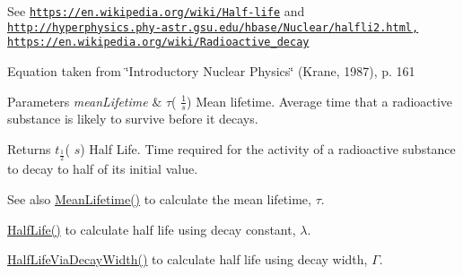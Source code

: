 See \href{https://en.wikipedia.org/wiki/Half-life}{\tt https\+://en.\+wikipedia.\+org/wiki/\+Half-\/life} and \href{http://hyperphysics.phy-astr.gsu.edu/hbase/Nuclear/halfli2.html,}{\tt http\+://hyperphysics.\+phy-\/astr.\+gsu.\+edu/hbase/\+Nuclear/halfli2.\+html,} \href{https://en.wikipedia.org/wiki/Radioactive_decay}{\tt https\+://en.\+wikipedia.\+org/wiki/\+Radioactive\+\_\+decay}

Equation taken from \char`\"{}\+Introductory Nuclear Physics\char`\"{} (Krane, 1987), p. 161


\begin{DoxyParams}{Parameters}
{\em mean\+Lifetime} & $\tau$( $\frac{1}{s}$) Mean lifetime. Average time that a radioactive substance is likely to survive before it decays. \\
\hline
\end{DoxyParams}
\begin{DoxyReturn}{Returns}
$t_{\frac{1}{2}}$( $s$) Half Life. Time required for the activity of a radioactive substance to decay to half of its initial value. 
\end{DoxyReturn}
\begin{DoxySeeAlso}{See also}
\hyperlink{group___atomic_gaa9e3c2deedda4bc7a745568b06fc47eb}{Mean\+Lifetime()} to calculate the mean lifetime, $\tau$. 

\hyperlink{group___half_life_ga21d268f154fb91c1c556bbfa7fe83ac1}{Half\+Life()} to calculate half life using decay constant, $\lambda$. 

\hyperlink{group___half_life_gaba3fda944d1a68ee1016a1f2f5809359}{Half\+Life\+Via\+Decay\+Width()} to calculate half life using decay width, $\Gamma$. 
\end{DoxySeeAlso}
